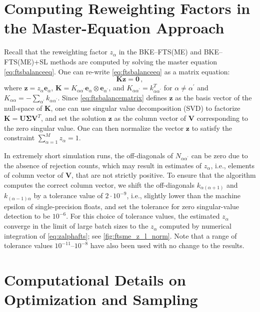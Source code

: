 \documentclass{article}
\numberwithin{equation}{section}
\def\*#1{\mathbf{#1}}
\theoremstyle{definition}
\theoremstyle{remark}
\begin{document}
\section{Computing Reweighting Factors in the Master-Equation Approach} \label{app:freenergymethods}

Recall that the reweighting factor $z_\alpha$ in the BKE--FTS(ME) and BKE--FTS(ME)+SL methods are computed by solving the master equation \cref{eq:ftsbalanceeq}. 
One can re-write \cref{eq:ftsbalanceeq} as a matrix equation:
\begin{equation}
 \* K \* z = \* 0 \,, \label{eq:ftsbalancematrix}
\end{equation}
where $\* z = z_\alpha \* e_\alpha$, $\* K = K_{\alpha \alpha^\prime} \* e_\alpha \otimes \* e_{\alpha^\prime}$, and $K_{\alpha \alpha^\prime} = k^T_{\alpha \alpha^\prime}$ for $\alpha \neq \alpha^\prime$ and $K_{\alpha \alpha} = -\sum_{\alpha^\prime} k_{\alpha \alpha^\prime}$. 
Since \cref{eq:ftsbalancematrix} defines $\* z$ as the basis vector of the null-space of $\* K$, one can use singular value decomposition (SVD) to factorize $\* K = \* U \bm \Sigma \* V^T$, and set the solution $\* z$ as the column vector of $\* V$ corresponding to the zero singular value. 
One can then normalize the vector $\* z$ to satisfy the constraint $\sum_{\alpha=1}^M z_\alpha = 1$. 

In extremely short simulation runs, the off-diagonals of $N_{\alpha \alpha^\prime}$ can be zero due to the absence of rejection counts, which may result in estimates of $z_\alpha$, i.e., elements of column vector of $\* V$, that are not strictly positive. 
To ensure that the algorithm computes the correct column vector, we shift the off-diagonals $k_{\alpha (\alpha+1)}$ and  $k_{(\alpha-1)\alpha}$ by a tolerance value of $2 \cdot 10^{-9}$, i.e., slightly lower than the machine epsilon of single-precision floats, and set the tolerance for zero singular-value detection to be $10^{-6}$. For this choice of tolerance values, the estimated $z_\alpha$ converge in the limit of large batch sizes to the $z_\alpha$ computed by numerical integration of \cref{eq:zalphafts}; see \cref{fig:ftsme_z_l_norm}. Note that a range of tolerance values $10^{-11}$--$10^{-8}$ have also been used with no change to the results. 

\section{Computational Details on Optimization and Sampling} \label{app:optimizer}
\end{document}
